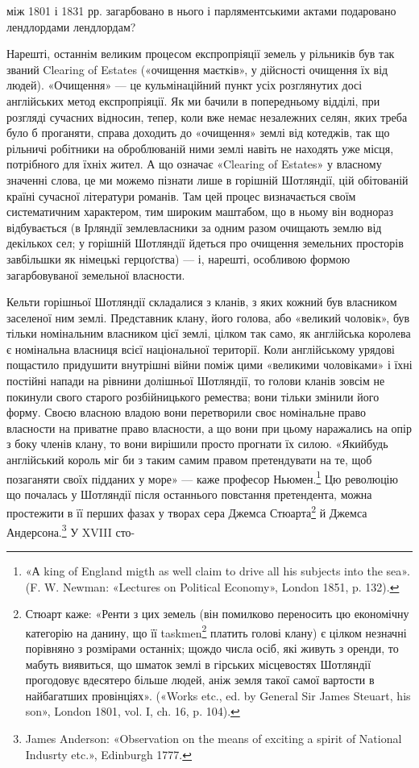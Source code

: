 між 1801 і 1831 рр. загарбовано в нього і парляментськими актами подаровано лендлордами лендлордам?

Нарешті, останнім великим процесом експропріяції земель у рільників був так званий Clearing of
Estates («очищення маєтків», у дійсності очищення їх від людей). «Очищення» — це кульмінаційний
пункт усіх розглянутих досі англійських метод експропріяції. Як ми бачили в попередньому відділі,
при розгляді сучасних відносин, тепер, коли вже немає незалежних селян, яких треба було б проганяти,
справа доходить до «очищення» землі від котеджів, так що рільничі робітники на оброблюваній ними
землі навіть не находять уже місця, потрібного для їхніх жител. А що означає «Clearing of Estates» у
власному значенні слова, це ми можемо пізнати лише в горішній Шотляндії, цій обітованій країні
сучасної літератури романів. Там цей процес
визначається своїм систематичним характером, тим широким маштабом, що в ньому він воднораз
відбувається (в Ірляндії землевласники за одним разом очищають землю від декількох сел; у горішній
Шотляндії йдеться про очищення земельних просторів
завбільшки як німецькі герцоґства) — і, нарешті, особливою формою загарбовуваної земельної
власности.

Кельти горішньої Шотляндії складалися з кланів, з яких кожний був власником заселеної ним землі.
Представник клану, його голова, або «великий чоловік», був тільки номінальним власником цієї землі,
цілком так само, як англійська королева є номінальна власниця всієї національної території. Коли
англійському урядові пощастило придушити внутрішні війни поміж цими «великими чоловіками» і їхні
постійні напади на рівнини долішньої Шотляндії, то голови кланів зовсім не покинули свого старого
розбійницького ремества; вони тільки змінили його форму. Своєю власною владою вони перетворили своє
номінальне право власности на приватне право власности, а що вони при цьому наражались на опір з
боку членів клану, то вони вирішили просто прогнати їх силою. «Якийбудь англійський король міг би з
таким самим правом претендувати на те, щоб позаганяти своїх підданих у море» — каже професор
Ньюмен.\footnote{
«А king of England migth as well claim to drive all his subjects into the sea». (F. W. Newman:
«Lectures on Political Economy», London 1851, p. 132).
} Цю революцію що почалась у Шотляндії після останнього повстання претендента, можна
простежити в її перших фазах у творах сера Джемса Стюарта\footnote{
Стюарт каже: «Ренти з цих земель (він помилково переносить цю економічну категорію на данину, що
її taskmen\footnote*{
— васаль. \emph{Ред.}
} платить голові клану) є цілком незначні порівняно з розмірами останніх; щождо числа
осіб, які живуть з оренди, то мабуть виявиться, що шматок землі в гірських місцевостях Шотляндії
прогодовує вдесятеро більше людей, аніж земля такої самої вартости в найбагатших провінціях».
(«Works etc., ed. by General Sir James Steuart, his son», London 1801, vol. I, ch. 16, p. 104).
} й Джемса Андерсона.\footnote{
James Anderson: «Observation on the means of exciting a spirit of National Indusrty etc.»,
Edinburgh 1777.
} У XVIII сто-